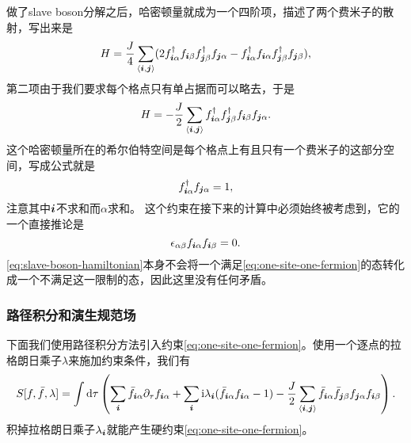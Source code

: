 做了slave boson分解之后，哈密顿量就成为一个四阶项，描述了两个费米子的散射，写出来是
\[
    {H} = \frac{J}{4} \sum_{\langle \vb*{i}, \vb*{j} \rangle} (2 {f}^\dagger_{\vb*{i} \alpha} {f}_{\vb*{i} \beta} {f}_{\vb*{j} \beta}^\dagger {f}_{\vb*{j} \alpha} - {f}^\dagger_{\vb*{i} \alpha} {f}_{\vb*{i} \alpha} {f}^\dagger_{\vb*{j} \beta} {f}_{\vb*{j} \beta}),
\]
第二项由于我们要求每个格点只有单占据而可以略去，于是
\begin{equation}
    {H} = - \frac{J}{2} \sum_{\langle \vb*{i}, \vb*{j} \rangle} {f}_{\vb*{i} \alpha}^\dagger {f}_{\vb*{j} \beta}^\dagger {f}_{\vb*{i} \beta} {f}_{\vb*{j} \alpha}.
    \label{eq:slave-boson-hamiltonian}
\end{equation}
这个哈密顿量所在的希尔伯特空间是每个格点上有且只有一个费米子的这部分空间，写成公式就是
\begin{equation}
    f_{\vb*{i} \alpha}^\dagger f_{\vb*{j} \alpha} = 1, 
    \label{eq:one-site-one-fermion}
\end{equation}
注意其中$\vb*{i}$不求和而$\alpha$求和。
这个约束在接下来的计算中必须始终被考虑到，它的一个直接推论是
\begin{equation}
    \epsilon_{\alpha \beta} f_{\vb*{i} \alpha} f_{\vb*{i} \beta} = 0.
\end{equation}
\eqref{eq:slave-boson-hamiltonian}本身不会将一个满足\eqref{eq:one-site-one-fermion}的态转化成一个不满足这一限制的态，因此这里没有任何矛盾。

\subsubsection{路径积分和演生规范场}

下面我们使用路径积分方法引入约束\eqref{eq:one-site-one-fermion}。使用一个逐点的拉格朗日乘子$\lambda$来施加约束条件，我们有
\begin{equation}
    S[f, \bar{f}, \lambda] = \int \dd{\tau} \left( \sum_{\vb*{i}} \bar{f}_{\vb*{i} \alpha} \partial_\tau f_{\vb*{i} \alpha} + \sum_{\vb*{i}} \mathrm{i} \lambda_{\vb*{i}} (\bar{f}_{\vb*{i} \alpha} f_{\vb*{i} \alpha} - 1) - \frac{J}{2} \sum_{\langle \vb*{i}, \vb*{j} \rangle} \bar{f}_{\vb*{i} \alpha} \bar{f}_{\vb*{j} \beta} f_{\vb*{j} \alpha} f_{\vb*{i} \beta} \right).
    \label{eq:spin-liquid-action}
\end{equation}
积掉拉格朗日乘子$\lambda_{\vb*{i}}$就能产生硬约束\eqref{eq:one-site-one-fermion}。

